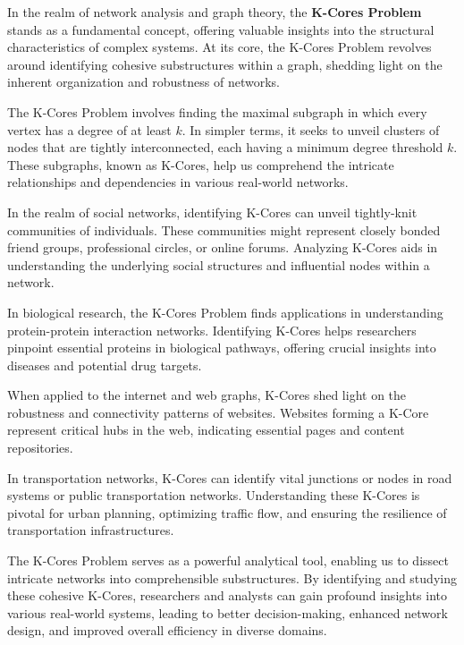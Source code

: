 In the realm of network analysis and graph theory, the \textbf{K-Cores Problem} stands as a fundamental concept, offering valuable insights into the structural characteristics of complex systems. At its core, the K-Cores Problem revolves around identifying cohesive substructures within a graph, shedding light on the inherent organization and robustness of networks.

The K-Cores Problem involves finding the maximal subgraph in which every vertex has a degree of at least \(k\). In simpler terms, it seeks to unveil clusters of nodes that are tightly interconnected, each having a minimum degree threshold \(k\). These subgraphs, known as K-Cores, help us comprehend the intricate relationships and dependencies in various real-world networks.

In the realm of social networks, identifying K-Cores can unveil tightly-knit communities of individuals. These communities might represent closely bonded friend groups, professional circles, or online forums. Analyzing K-Cores aids in understanding the underlying social structures and influential nodes within a network.

In biological research, the K-Cores Problem finds applications in understanding protein-protein interaction networks. Identifying K-Cores helps researchers pinpoint essential proteins in biological pathways, offering crucial insights into diseases and potential drug targets.

When applied to the internet and web graphs, K-Cores shed light on the robustness and connectivity patterns of websites. Websites forming a K-Core represent critical hubs in the web, indicating essential pages and content repositories.

In transportation networks, K-Cores can identify vital junctions or nodes in road systems or public transportation networks. Understanding these K-Cores is pivotal for urban planning, optimizing traffic flow, and ensuring the resilience of transportation infrastructures.

The K-Cores Problem serves as a powerful analytical tool, enabling us to dissect intricate networks into comprehensible substructures. By identifying and studying these cohesive K-Cores, researchers and analysts can gain profound insights into various real-world systems, leading to better decision-making, enhanced network design, and improved overall efficiency in diverse domains.
